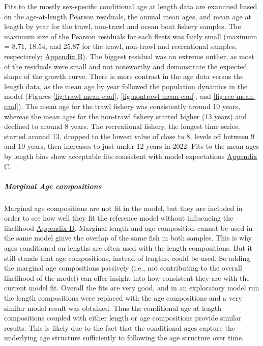 \documentclass[11pt,
  letterpaper,
]{article}
\begin{document}
Fits to the mostly sex-specific conditional age at length data are examined based on the age-at-length Pearson residuals, the annual mean ages, and mean age at length by year for the trawl, non-trawl and ocean boat fishery samples. The maximum size of the Pearson residuals for each fleets was fairly small (maximum = 8.71, 18.54, and 25.87 for the trawl, non-trawl and recreational samples, respectively; \protect\hyperlink{app_b}{Appendix B}). The biggest residual was an extreme outlier, as most of the residuals were small and not noteworthy and demonstrate the expected shape of the growth curve. There is more contrast in the age data versus the length data, as the mean age by year followed the population dynamics in the model (Figures \ref{fig:trawl-mean-caal}, \ref{fig:nontrawl-mean-caal}, and \ref{fig:rec-mean-caal}). The mean age for the trawl fishery was consistently around 10 years, whereas the mean ages for the non-trawl fishery started higher (13 years) and declined to around 8 years. The recreational fishery, the longest time series, started around 13, dropped to the lowest value of close to 8, levels off between 9 and 10 years, then increases to just under 12 years in 2022. Fits to the mean ages by length bins show acceptable fits consistent with model expectations \protect\hyperlink{app_c}{Appendix C}.

\hypertarget{marginal-age-compositions}{%
\subparagraph{Marginal Age compositions}\label{marginal-age-compositions}}

Marginal age compositions are not fit in the model, but they are included in order to see how well they fit the reference model without influencing the likelihood \protect\hyperlink{app_d}{Appendix D}. Marginal length and age composition cannot be used in the same model ginve the overlap of the same fish in both samples. This is why ages conditioned on lengths are often used with the length compositions. But it still stands that age compositions, instead of lengths, could be used. So adding the marginal age compositions passively (i.e., not contributing to the overall likelihood of the model) can offer insight into how consistent they are with the current model fit. Overall the fits are very good, and in an exploratory model run the length compositions were replaced with the age compositions and a very similar model result was obtained. Thus the conditional age at length compositions coupled with either length or age compositions provide similar results. This is likely due to the fact that the conditional ages capture the underlying age structure sufficiently to following the age structure over time.
\end{document}
